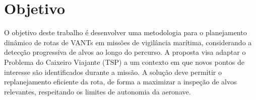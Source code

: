 \section{Objetivo}

O objetivo deste trabalho é desenvolver uma metodologia para o planejamento dinâmico de rotas de VANTs em missões de vigilância marítima, considerando a detecção progressiva de alvos ao longo do percurso. A proposta visa adaptar o Problema do Caixeiro Viajante (TSP) a um contexto em que novos pontos de interesse são identificados durante a missão. A solução deve permitir o replanejamento eficiente da rota, de forma a maximizar a inspeção de alvos relevantes, respeitando os limites de autonomia da aeronave.